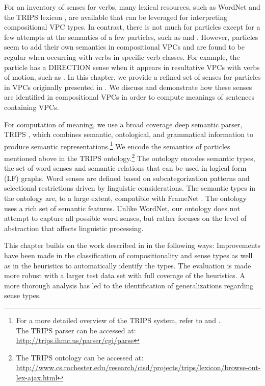 \documentclass[output=paper,modfonts,nonflat]{langsci/langscibook}
\begin{document}
For an inventory of senses for verbs, many lexical resources, such as WordNet \citep{Mil95,Fel98} and the TRIPS lexicon \citep{All17}, are available that can be leveraged for interpreting compositional VPC types. In contrast, there is not much for particles except for a few attempts at the semantics of a few particles, such as  \citep{Coo06} and  \citep{Tyl03}. However, particles seem to add their own semantics in compositional VPCs and are found to be regular when occurring with verbs in specific verb classes. For example, the particle  has a DIRECTION sense when it appears in resultative VPCs with verbs of motion, such as  \citep{Vil06}. In this chapter, we provide a refined set of senses for particles in VPCs originally presented in \citet{Bha17}. We discuss and demonstrate how these senses are identified in compositional VPCs in order to compute meanings of sentences containing VPCs. 

For computation of meaning, we use a broad coverage deep semantic parser, TRIPS \citep{All07}, which combines semantic, ontological, and grammatical information to produce semantic representations.\footnote{For a more detailed overview of the TRIPS system, refer to \citet{All17} and \citet{All08}.\\The TRIPS parser can be accessed at: \url{http://trips.ihmc.us/parser/cgi/parse}} We encode the semantics of particles mentioned above in the TRIPS ontology.\footnote{The TRIPS ontology can be accessed at: \url{http://www.cs.rochester.edu/research/cisd/projects/trips/lexicon/browse-ont-lex-ajax.html}} The ontology encodes semantic types, the set of word senses and semantic relations that can be used in logical form (LF) graphs. Word senses are defined based on subcategorization patterns and selectional restrictions driven by linguistic considerations. The semantic types in the ontology are, to a large extent, compatible with FrameNet \citep{Joh00}. The ontology uses a rich set of semantic features. Unlike WordNet, our ontology does not attempt to capture all possible word senses, but rather focuses on the level of abstraction that affects linguistic processing.

This chapter builds on the work described in \citet{Bha17} in the following ways: Improvements have been made in the classification of compositionality and sense types as well as in the heuristics to automatically identify the types. The evaluation is made more robust with a larger test data set with full coverage of the heuristics. A more thorough analysis has led to the identification of generalizations regarding sense types. 
\end{document}

